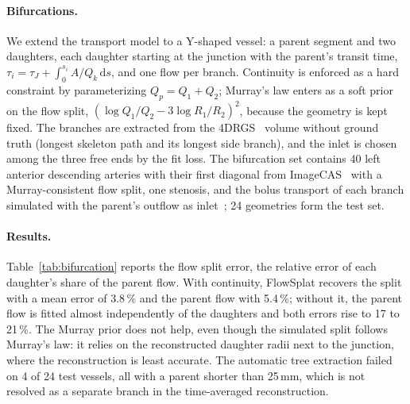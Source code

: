 
\paragraph{Bifurcations.}
We extend the transport model to a Y-shaped vessel: a parent segment and
two daughters, each daughter starting at the junction with the parent's
transit time, $\tau_i = \tau_J + \int_0^{s_i} A/Q_k\,\mathrm{d}s$, and one
flow per branch. Continuity is enforced as a hard constraint by
parameterizing $Q_p = Q_1 + Q_2$; Murray's law enters as a soft prior on the
flow split, $(\log Q_1/Q_2 - 3\log R_1/R_2)^2$, because the geometry is kept
fixed. The branches are extracted from the 4DRGS~\cite{liu2025fourdrgs}
volume without ground truth (longest skeleton path and its longest side
branch), and the inlet is chosen among the three free ends by the fit loss.
The bifurcation set contains 40 left anterior descending arteries with their
first diagonal from ImageCAS~\cite{zeng2023imagecas} with a Murray-consistent
flow split, one stenosis, and the bolus transport of each branch simulated
with the parent's outflow as inlet~\cite{thakur2026punch}; 24 geometries form
the test set.

\paragraph{Results.}
Table~\ref{tab:bifurcation} reports the flow split error, the relative error
of each daughter's share of the parent flow. With continuity, FlowSplat
recovers the split with a mean error of 3.8\,\% and the parent flow with
5.4\,\%; without it, the parent flow is fitted almost independently of the
daughters and both errors rise to 17 to 21\,\%. The Murray prior does not
help, even though the simulated split follows Murray's law: it relies on the
reconstructed daughter radii next to the junction, where the reconstruction
is least accurate. The automatic tree extraction failed on 4 of 24 test
vessels, all with a parent shorter than 25\,mm, which is not resolved as a
separate branch in the time-averaged reconstruction.

